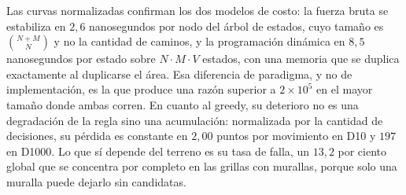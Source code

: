 Las curvas normalizadas confirman los dos modelos de costo: la fuerza bruta se
estabiliza en $2{,}6$ nanosegundos por nodo del árbol de estados, cuyo tamaño
es $\binom{N+M}{N}$ y no la cantidad de caminos, y la programación dinámica en
$8{,}5$ nanosegundos por estado sobre $N \cdot M \cdot V$ estados, con una
memoria que se duplica exactamente al duplicarse el área. Esa diferencia de
paradigma, y no de implementación, es la que produce una razón superior a
$2 \times 10^5$ en el mayor tamaño donde ambas corren. En cuanto al greedy, su
deterioro no es una degradación de la regla sino una acumulación: normalizada
por la cantidad de decisiones, su pérdida es constante en $2{,}00$ puntos por
movimiento en D10 y $197$ en D1000. Lo que sí depende del terreno es su tasa de
falla, un $13{,}2$ por ciento global que se concentra por completo en las
grillas con murallas, porque solo una muralla puede dejarlo sin candidatas.
